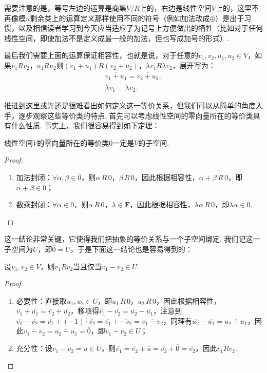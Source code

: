 需要注意的是，等号左边的运算是商集$V/R$上的，右边是线性空间$V$上的，这里不再像模$n$剩余类上的运算定义那样使用不同的符号（例如加法改成$\oplus$）是出于习惯，以及相信读者学习到今天应当适应了为记号上方便做出的牺牲（比如对于任何线性空间，即使加法不是定义成最一般的加法，但也写成加号的形式）.

最后我们需要上面的运算保证相容性，也就是说，对于任意的$v_1,v_2,u_1,u_2\in V$，如果$v_1Rv_2$，$u_1Ru_2$则$(v_1+u_1)R(v_2+u_2)$，$\lambda v_1R\lambda v_2$，展开写为：
\begin{gather*}
    \overline{v_1+u_1}=\overline{v_2+u_2},\\
    \overline{\lambda v_1}=\overline{\lambda v_2}.
\end{gather*}

推进到这里或许还是很难看出如何定义这一等价关系，但我们可以从简单的角度入手，逐步观察这些等价类的特点. 首先可以考虑线性空间的零向量所在的等价类具有什么性质. 事实上，我们很容易得到如下定理：
\begin{theorem}{}{}
    线性空间$V$的零向量所在的等价类$\overline{0}$一定是$V$的子空间.
\end{theorem}
\begin{proof}
    \begin{enumerate}
        \item 加法封闭：$\forall \alpha,\beta\in\overline{0}$，则$\alpha\,R\,0$，$\beta\,R\,0$，因此根据相容性，$\alpha+\beta\,R\,0$，即$\alpha+\beta\in\overline{0}$；
        \item 数乘封闭：$\forall \alpha\in\overline{0}$，则$\alpha\,R\,0$，$\lambda\in\mathbf{F}$，因此根据相容性，$\lambda\alpha\,R\,0$，即$\lambda\alpha\in\overline{0}$.
    \end{enumerate}
\end{proof}

这一结论非常关键，它使得我们把抽象的等价关系与一个子空间绑定. 我们记这一子空间为$U$，即$\overline{0}=U$，于是下面这一结论也是容易得到的：
\begin{theorem}{}{}
    设$v_1,v_2\in V$，则$v_1Rv_2$当且仅当$v_1-v_2\in U$.
\end{theorem}
\begin{proof}
    \begin{enumerate}
        \item 必要性：直接取$u_1,u_2\in U$，即$u_1\,R\,0$，$u_2\,R\,0$，因此根据相容性，$\overline{v_1}+\overline{u_1}=\overline{v_2}+\overline{u_2}$，移项得$\overline{v_1}-\overline{v_2}=\overline{u_2}-\overline{u_1}$，注意到$\overline{v_1}-\overline{v_2}=\overline{v_1}+(-1)\cdot\overline{v_2}=\overline{v_1}+\overline{-v_2}=\overline{v_1-v_2}$，同理有$\overline{u_2}-\overline{u_1}=\overline{u_2-u_1}$，因此$\overline{v_1-v_2}=\overline{u_2-u_1}=\overline{0}$，即$v_1-v_2\in U$；
        \item 充分性：设$v_1-v_2=u\in U$，则$\overline{v_1}=\overline{v_2}+\overline{u}=\overline{v_2}+\overline{0}=\overline{v_2}$，因此$v_1Rv_2$.
    \end{enumerate}
\end{proof}

